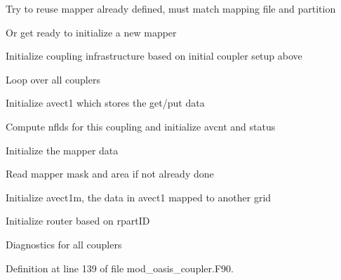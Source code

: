\begin{DoxyItemize}
\begin{DoxyItemize}
\begin{DoxyItemize}
\begin{DoxyItemize}
\item Try to reuse mapper already defined, must match mapping file and partition
\item Or get ready to initialize a new mapper
\end{DoxyItemize}
\end{DoxyItemize}
\end{DoxyItemize}
\item Initialize coupling infrastructure based on initial coupler setup above
\item Loop over all couplers
\begin{DoxyItemize}
\item Initialize avect1 which stores the get/put data
\item Compute nflds for this coupling and initialize avcnt and status
\item Initialize the mapper data
\item Read mapper mask and area if not already done
\item Initialize avect1m, the data in avect1 mapped to another grid
\item Initialize router based on rpart\+I\+D
\end{DoxyItemize}
\item Diagnostics for all couplers 
\end{DoxyItemize}

Definition at line 139 of file mod\+\_\+oasis\+\_\+coupler.\+F90.

